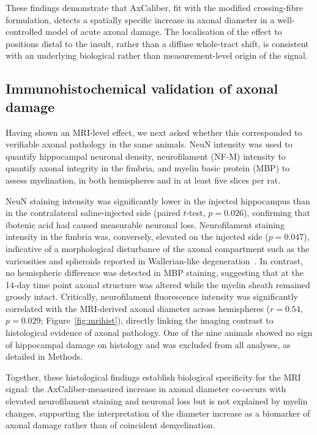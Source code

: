 \documentclass[11pt]{article}
\begin{document}
These findings demonstrate that AxCaliber, fit with the modified crossing-fibre formulation, detects a spatially specific increase in axonal diameter in a well-controlled model of acute axonal damage. The localisation of the effect to positions distal to the insult, rather than a diffuse whole-tract shift, is consistent with an underlying biological rather than measurement-level origin of the signal.

\subsection{Immunohistochemical validation of axonal damage}

Having shown an MRI-level effect, we next asked whether this corresponded to verifiable axonal pathology in the same animals. NeuN intensity was used to quantify hippocampal neuronal density, neurofilament (NF-M) intensity to quantify axonal integrity in the fimbria, and myelin basic protein (MBP) to assess myelination, in both hemispheres and in at least five slices per rat.

NeuN staining intensity was significantly lower in the injected hippocampus than in the contralateral saline-injected side (paired $t$-test, $p=0.026$), confirming that ibotenic acid had caused measurable neuronal loss. Neurofilament staining intensity in the fimbria was, conversely, elevated on the injected side ($p=0.047$), indicative of a morphological disturbance of the axonal compartment such as the varicosities and spheroids reported in Wallerian-like degeneration~\cite{criste2014axonal,tallantyre2010demyelinated}. In contrast, no hemispheric difference was detected in MBP staining, suggesting that at the 14-day time point axonal structure was altered while the myelin sheath remained grossly intact. Critically, neurofilament fluorescence intensity was significantly correlated with the MRI-derived axonal diameter across hemispheres ($r=0.54$, $p=0.029$; Figure~\ref{fig:mrihist}), directly linking the imaging contrast to histological evidence of axonal pathology. One of the nine animals showed no sign of hippocampal damage on histology and was excluded from all analyses, as detailed in Methods.

Together, these histological findings establish biological specificity for the MRI signal: the AxCaliber-measured increase in axonal diameter co-occurs with elevated neurofilament staining and neuronal loss but is not explained by myelin changes, supporting the interpretation of the diameter increase as a biomarker of axonal damage rather than of coincident demyelination.
\end{document}
